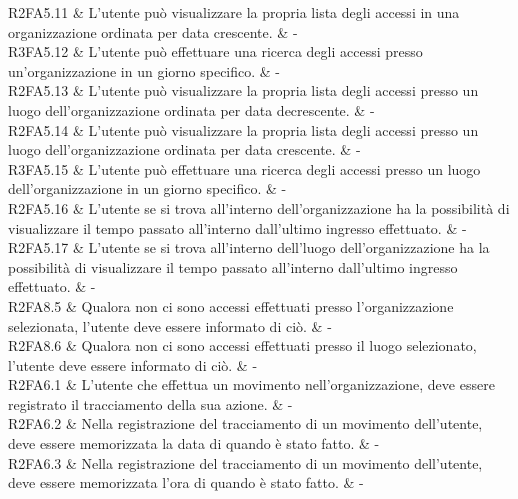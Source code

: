 R2FA5.11 & L’utente può visualizzare la propria lista degli accessi in una organizzazione ordinata per data crescente.  & - \\

R3FA5.12 & L’utente può effettuare una ricerca degli accessi presso un'organizzazione in un giorno specifico. & - \\

R2FA5.13 & L’utente può visualizzare la propria lista degli accessi presso un luogo dell’organizzazione  ordinata per data decrescente.  & - \\

R2FA5.14 & L’utente può visualizzare la propria lista degli accessi presso un luogo dell’organizzazione  ordinata per data crescente.  & - \\

R3FA5.15 & L’utente può effettuare una ricerca degli accessi presso un luogo dell’organizzazione  in un giorno specifico.  & - \\

R2FA5.16 & L’utente se si trova all’interno dell’organizzazione ha la possibilità di visualizzare il tempo passato all’interno dall'ultimo ingresso effettuato.  & - \\

R2FA5.17 & L’utente se si trova all’interno dell’luogo dell’organizzazione ha la possibilità di visualizzare il tempo passato all’interno dall'ultimo ingresso effettuato.  & - \\

R2FA8.5 & Qualora non ci sono accessi effettuati presso l'organizzazione selezionata, l'utente deve essere informato di ciò. & - \\

R2FA8.6 & Qualora non ci sono accessi effettuati presso il luogo selezionato, l'utente deve essere informato di ciò.  & - \\

R2FA6.1 & L’utente che effettua un movimento nell’organizzazione, deve essere registrato il tracciamento della sua azione.  & - \\

R2FA6.2 & Nella registrazione del tracciamento di un movimento dell’utente, deve essere memorizzata la data di quando è stato fatto.  & - \\

R2FA6.3 & Nella registrazione del tracciamento di un movimento dell’utente, deve essere memorizzata l’ora di quando è stato fatto.  & - \\

